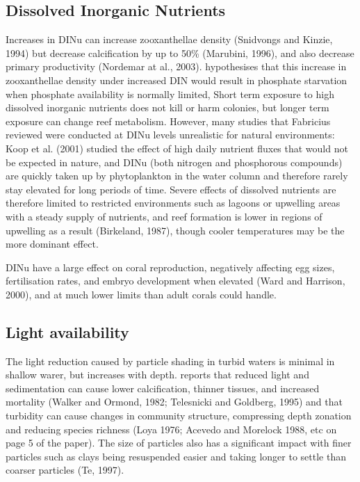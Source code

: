 \documentclass[11pt,a4paper]{article}
\begin{document}
\subsection{Dissolved Inorganic Nutrients}

Increases in DINu can increase zooxanthellae density (Snidvongs and Kinzie, 1994) but decrease calcification by up to 50\% (Marubini, 1996), and also decrease primary productivity (Nordemar at al., 2003). \cite{Wiedemann2013} hypothesises that this increase in zooxanthellae density under increased DIN would result in phosphate starvation when phosphate availability is normally limited, 
 Short term exposure to high dissolved inorganic nutrients does not kill or harm colonies, but longer term exposure can change reef metabolism. However, many studies that Fabricius reviewed were conducted at DINu levels unrealistic for natural environments: Koop et al. (2001) studied the effect of high daily nutrient fluxes that would not be expected in nature, and DINu (both nitrogen and phosphorous compounds) are quickly taken up by phytoplankton in the water column and therefore rarely stay elevated for long periods of time. Severe effects of dissolved nutrients are therefore limited to restricted environments such as lagoons or upwelling areas with a steady supply of nutrients, and reef formation is lower in regions of upwelling as a result (Birkeland, 1987), though cooler temperatures may be the more dominant effect.

DINu have a large effect on coral reproduction, negatively affecting egg sizes, fertilisation rates, and embryo development when elevated (Ward and Harrison, 2000), and at much lower limits than adult corals could handle.


\subsection{Light availability}

The light reduction caused by particle shading in turbid waters is minimal in shallow warer, but increases with depth. \cite{Fabricius2005} reports that reduced light and sedimentation can cause lower calcification, thinner tissues, and increased mortality (Walker and Ormond, 1982; Telesnicki and Goldberg, 1995) and that turbidity can cause changes in community structure, compressing depth zonation and reducing species richness (Loya 1976; Acevedo and Morelock 1988, etc on page 5 of the paper). The size of particles also has a significant impact with finer particles such as clays being resuspended easier and taking longer to settle than coarser particles (Te, 1997). 
\end{document}
